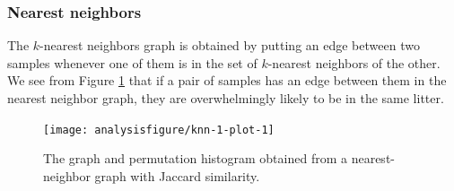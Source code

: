 \subsubsection*{Nearest neighbors}

The $k$-nearest neighbors graph is obtained by putting an edge between
two samples whenever one of them is in the set of $k$-nearest
neighbors of the other. We see from Figure \ref{fig:knn-1-plot} that
if a pair of samples has an edge between them in the nearest neighbor
graph, they are overwhelmingly likely to be in the same litter.

\begin{knitrout}
\color{fgcolor}\begin{kframe}
\begin{alltt}
 \hlkwb{<-}  \hlstd{,}  \hlstd{=} \hlstd{,}
                       \hlstd{=} \hlstd{,}  \hlstd{=} \hlstd{,}  \hlstd{=} \hlstd{)}
\end{alltt}
\end{kframe}
\end{knitrout}

\begin{figure}[H]
\begin{knitrout}
\color{fgcolor}\begin{kframe}
\begin{alltt}
\hlkwb{=} \hlopt{+} \hlstd{(} \hlstd{=} \hlstd{(} \hlstd{=} \hlstd{),}
         \hlstd{=} \hlstd{(} \hlstd{=} \hlstd{))}
\hlkwb{=}
\hlstd{(} \hlstd{=} 
\end{alltt}
\end{kframe}

{\centering \texttt{[image: analysisfigure/knn-1-plot-1]} 

}



\end{knitrout}
\caption{The graph and permutation histogram obtained from a
  nearest-neighbor graph with Jaccard similarity.}
\label{fig:knn-1-plot}
\end{figure}

